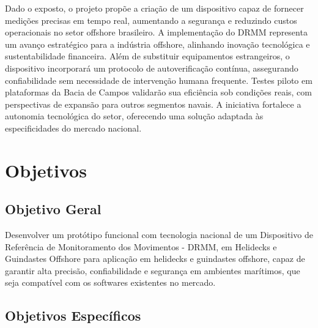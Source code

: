 \documentclass[a4paper, 12pt]{article}
\begin{document}
    Dado o exposto, o projeto propõe a criação de um dispositivo capaz de fornecer medições precisas em tempo real, aumentando a segurança e reduzindo custos operacionais no setor offshore brasileiro. A implementação do DRMM representa um avanço estratégico para a indústria offshore, alinhando inovação tecnológica e sustentabilidade financeira. Além de substituir equipamentos estrangeiros, o dispositivo incorporará um protocolo de autoverificação contínua, assegurando confiabilidade sem necessidade de intervenção humana frequente. Testes piloto em plataformas da Bacia de Campos validarão sua eficiência sob condições reais, com perspectivas de expansão para outros segmentos navais. A iniciativa fortalece a autonomia tecnológica do setor, oferecendo uma solução adaptada às especificidades do mercado nacional.


\newpage
\section*{Objetivos}

\subsection{Objetivo Geral}
    Desenvolver um protótipo funcional com tecnologia nacional de um Dispositivo de Referência de Monitoramento dos Movimentos - DRMM, em Helidecks e Guindastes Offshore para aplicação em helidecks e guindastes offshore, capaz de garantir alta precisão, confiabilidade e segurança em ambientes marítimos, que seja compatível com os softwares existentes no mercado.

\subsection{Objetivos Específicos}
\end{document}
